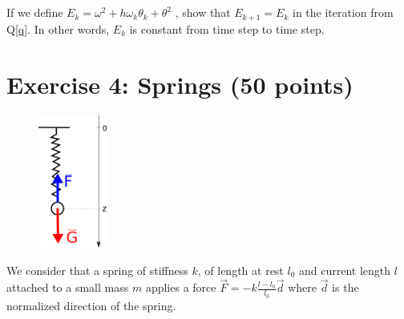 \subsection{} If we define $E_k = \omega^2 + h\omega_k\theta_k + \theta^2$ , show that $E_{k+1} = E_k$ in the iteration from Q\ref{q}. In other words, $E_k$ is constant from time step to time step.
  
 
\section*{Exercise 4: Springs \normalsize \textnormal(50 points)}


\begin{figure}
  \centering
  \vspace{-0.5cm}
\includegraphics[width=0.2\textwidth]{spring.png}
\vspace{-1.5cm}
\end{figure}

We consider that a spring of stiffness $k$, of length at rest $l_0$ and current length $l$ attached to a small mass $m$ applies a force $\vec{F} = -k\frac{l - l_0}{l_0} \vec{d}$ where $\vec{d}$ is the normalized direction of the spring.

